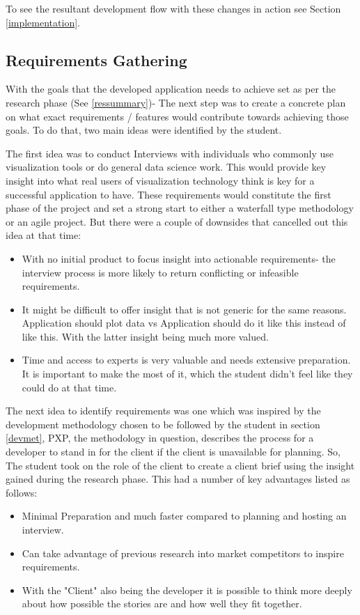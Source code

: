 To see the resultant development flow with these changes in action see Section \ref{implementation}.

\subsection{Requirements Gathering} \label{reqgat}
With the goals that the developed application needs to achieve set as per the research phase (See \ref{ressummary})- The next step was to create a concrete plan on what exact requirements / features would contribute towards achieving those goals. To do that, two main ideas were identified by the student.

The first idea was to conduct Interviews with individuals who commonly use visualization tools or do general data science work. This would provide key insight into what real users of visualization technology think is key for a successful application to have. These requirements would constitute the first phase of the project and set a strong start to either a waterfall type methodology or an agile project.
But there were a couple of downsides that cancelled out this idea at that time:
\begin{itemize}
    \item With no initial product to focus insight into actionable requirements- the interview process is more likely to return conflicting or infeasible requirements.
    \item It might be difficult to offer insight that is not generic for the same reasons. Application should plot data vs Application should do it like this instead of like this. With the latter insight being much more valued.
    \item Time and access to experts is very valuable and needs extensive preparation. It is important to make the most of it, which the student didn’t feel like they could do at that time.
\end{itemize}

The next idea to identify requirements was one which was inspired by the development methodology chosen to be followed by the student in section \ref{devmet}, PXP, the methodology in question, describes the process for a developer to stand in for the client if the client is unavailable for planning. So, The student took on the role of the client to create a client brief using the insight gained during the research phase. This had a number of key advantages listed as follows:

\begin{itemize}
    \item Minimal Preparation and much faster compared to planning and hosting an interview.
    \item Can take advantage of previous research into market competitors to inspire requirements.
    \item With the "Client" also being the developer it is possible to think more deeply about how possible the stories are and how well they fit together.
\end{itemize}

